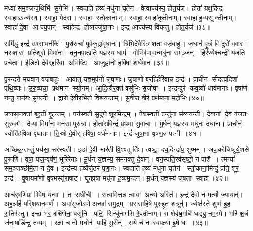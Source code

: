 मध्वा॑ सम॒ञ्जन्प॒थिभि॑ सु॒गेभि॑।
स्वदा॑ति ह॒व्यं मधु॑ना घृ॒तेन॑।
वेत्वाज्य॑स्य॒ होत॒र्यज॑।
होता॑ यक्ष॒दिन्द्र॒ स्वाहाऽऽज्य॑स्य।
स्वाहा॒ मेद॑सः।
स्वाहा स्तो॒कानाम्।
स्वाहा॒ स्वाहा॑कृतीनाम्।
स्वाहा॑ ह॒व्यसूक्तीनाम्।
स्वाहा॑ दे॒वा आज्य॒पान्।
स्वाहेन्द्र हो॒त्राज्जु॑षा॒णाः।
इन्द्र॒ आज्य॑स्य वियन्तु।
होत॒र्यज॑॥३८॥\anuvakamend[तेज॑साऽऽसददवर्धतां॒ भार॑तीन्द्रि॒यं जु॑षा॒णा द्वे च॑ (स॒मिधेन्द्र॒न्तनू॒नपा॑त॒मिडा॑भिर्ब॒र्॒हिष्योज॑ उ॒षे दैव्या॑ ति॒स्रस्त्वष्टा॑रं॒ वन॒स्पति॒मिन्द्रम् ॥ स॒मिधेन्द्रं॑ च॒तुर्वेत्वेको॑ वि॒यन्तु॒ द्विर्वी॒तामेको॑ वि॒यन्तु॒ द्विर्वेत्वेको॑ वि॒यन्तु॒ होत॒र्यज॑ ॥ )]

समि॑द्ध॒ इन्द्र॑ उ॒षसा॒मनी॑के।
पु॒रो॒रुचा॑ पूर्व॒कृद्वा॑वृधा॒नः।
त्रि॒भिर्दे॒वैस्त्रि॒शता॒ वज्र॑बाहुः।
ज॒घान॑ वृ॒त्रं वि दुरो॑ ववार।
नरा॒शस॒ प्रति॒शूरो॒ मिमा॑नः।
तनू॒नपा॒त्प्रति॑ य॒ज्ञस्य॒ धाम॑।
गोभि॑र्व॒पावा॒न्मधु॑ना सम॒ञ्जन्।
हिर॑ण्यैश्च॒न्द्री य॑जति॒ प्रचे॑ताः।
ई॒डि॒तो दे॒वैर्‌हरि॑वा अभि॒ष्टिः।
आ॒जुह्वा॑नो ह॒विषा॒ शर्ध॑मानः॥३९॥

पु॒र॒न्द॒रो म॒घवा॒न् वज्र॑बाहुः।
आया॑तु य॒ज्ञमुप॑नो जुषा॒णः।
जु॒षा॒णो ब॒र्‌हिर्हरि॑वान्न॒ इन्द्र॑।
प्रा॒चीन सीदत्प्र॒दिशा॑ पृथि॒व्याः।
उ॒रु॒व्यचा॒ प्रथ॑मान स्यो॒नम्।
आ॒दि॒त्यैर॒क्तं वसु॑भिः स॒जोषा।
इन्द्र॒न्दुर॑ कव॒ष्यो॑ धाव॑मानाः।
वृषा॑णं यन्तु॒ जन॑यः सु॒पत्नी।
द्वारो॑ दे॒वीर॒भितो॒ विश्र॑यन्ताम्।
सु॒वीरा॑ वी॒रं प्रथ॑माना॒ महो॑भिः॥४०॥

उ॒षासा॒नक्ता॑ बृह॒ती बृ॒हन्तम्।
पय॑स्वती सु॒दुघे॒ शूर॒मिन्द्रम्।
पेश॑स्वती॒ तन्तु॑ना संव्यय॑न्ती।
दे॒वानां दे॒वं य॑जतः सुरु॒क्मे।
दैव्या॒ मिमा॑ना॒ मन॑सा पुरु॒त्रा।
होता॑रा॒विन्द्रं॑ प्रथ॒मा सु॒वाचा।
मू॒र्धन् य॒ज्ञस्य॒ मधु॑ना॒ दधा॑ना।
प्रा॒चीनं॒ ज्योति॑र्\mbox{}ह॒विषा॑ वृधातः।
ति॒स्रो दे॒वीर्‌ ह॒विषा॒ वर्ध॑मानाः।
इन्द्रं॑ जुषा॒णा वृष॑ण॒न्न पत्नी॥४१॥

अच्छि॑न्न॒न्तन्तुं॒ पय॑सा॒ सर॑स्वती।
इडा॑ दे॒वी भार॑ती वि॒श्वतूर्तिः।
त्वष्टा॒ दध॒दिन्द्रा॑य॒ शुष्मम्।
अपा॒कोचि॑ष्टुर्य॒शसे॑ पु॒रूणि॑।
वृषा॒ यज॒न्वृष॑णं॒ भूरि॑रेताः।
मू॒र्धन् य॒ज्ञस्य॒ सम॑नक्तु दे॒वान्।
वन॒स्पति॒रव॑सृष्टो॒ न पाशै।
त्मन्या॑ सम॒ञ्जञ्छ॑मि॒ता न दे॒वः।
इन्द्र॑स्य ह॒व्यैर्ज॒ठरं॑ पृणा॒नः।
स्वदा॑ति ह॒व्यं मधु॑ना घृ॒तेन॑।
स्तो॒काना॒मिन्दुं॒ प्रति॒ शूर॒ इन्द्र॑।
वृ॒षा॒यमा॑णो वृष॒भस्तु॑रा॒षाट्।
घृ॒त॒प्रुषा॒ मधु॑ना ह॒व्यमु॒न्दन्।
मू॒र्धन् य॒ज्ञस्य॑ जुषता॒ स्वाहा॥४२॥\anuvakamend[शर्ध॑मानो॒ महो॑भि॒ पत्नीर्घृ॒तेन॑ च॒त्वारि॑ च]

आच॑र्‌षणि॒प्रा वि॒वेष॒ यन्मा।
त स॒ध्रीची।
स॒त्यमित्तन्न त्वावा अ॒न्यो अस्ति॑।
इन्द्र॑ दे॒वो न मर्त्यो॒ ज्यायान्॑।
अह॒न्नहिं॑ परि॒शया॑न॒मर्ण॑।
अवा॑सृजो॒ऽपो अच्छा॑ समु॒द्रम्।
प्रस॑साहिषे पुरुहूत॒ शत्रून्॑।
ज्येष्ठ॑स्ते॒ शुष्म॑ इ॒ह रा॒तिर॑स्तु।
इन्द्रा भ॑र॒ दक्षि॑णेना॒ वसू॑नि।
पति॒ सिन्धू॑नामसि रे॒वती॑नाम्।
स शेवृ॑ध॒मधि॑ धाद्द्यु॒म्नम॒स्मे।
महि॑ क्ष॒त्रं ज॑ना॒षाडि॑न्द्र॒ तव्यम्।
रक्षा॑ च नो म॒घोन॑ पा॒हि सू॒रीन्।
रा॒ये च॑ नः स्वप॒त्या इ॒षे धा॥४३॥\anuvakamend[रे॒वती॑नाञ्च॒त्वारि॑ च]

